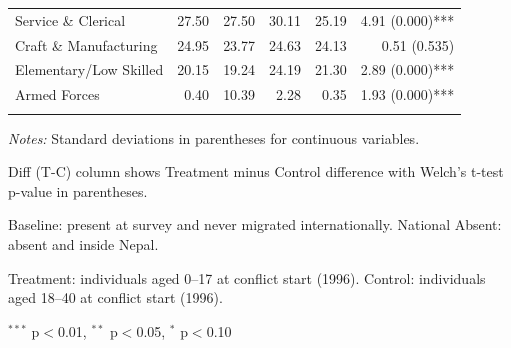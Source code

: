 \begin{table}[htbp]
\begin{tabular}{lrrrrr}
\quad Service \& Clerical & 27.50 & 27.50 & 30.11 & 25.19 & 4.91 (0.000)*** \\
\quad Craft \& Manufacturing & 24.95 & 23.77 & 24.63 & 24.13 & 0.51 (0.535) \\
\quad Elementary/Low Skilled & 20.15 & 19.24 & 24.19 & 21.30 & 2.89 (0.000)*** \\
\quad Armed Forces & 0.40 & 10.39 & 2.28 & 0.35 & 1.93 (0.000)*** \\
\addlinespace
\bottomrule
\end{tabular}
\begin{tablenotes}
\small
\item \textit{Notes:} Standard deviations in parentheses for continuous variables.
\item Diff (T-C) column shows Treatment minus Control difference with Welch's t-test p-value in parentheses.
\item Baseline: present at survey and never migrated internationally. National Absent: absent and inside Nepal.
\item Treatment: individuals aged 0--17 at conflict start (1996). Control: individuals aged 18--40 at conflict start (1996).
\item $^{***}$ p$<$0.01, $^{**}$ p$<$0.05, $^{*}$ p$<$0.10
\end{tablenotes}
\end{table}